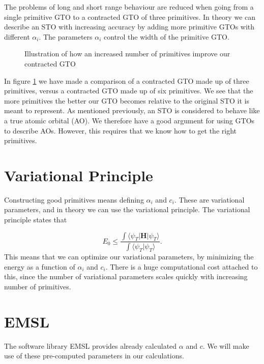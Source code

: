 \documentclass[a4paper,norsk,11pt,twoside]{report}
\begin{document}
The problems of long and short range behaviour are reduced when going
from a single primitive GTO to a contracted GTO of three
primitives. In theory we can describe an STO with increasing accuracy by
adding more primitive GTOs with different $\alpha_i$. The parameters $\alpha_i$
control the width of the primitive GTO.  \\

\begin{figure}[h!]
\begin{center}
\caption{Illustration of how an increased number of primitives improve our contracted GTO}
\label{fig:STOvsGTO3}
\end{center}
\end{figure}

In figure \ref{fig:STOvsGTO3} we have made a comparison of a
contracted GTO made up of three primitives, versus a contracted GTO
made up of six primitives. We see that the more primitives the better our
GTO becomes relative to the original STO it is meant to represent. As mentioned previously, an STO is
considered to behave like a true atomic orbital (AO). We therefore have a
good argument for using GTOs to describe AOs. However, this requires
that we know how to get the right primitives.

\section{Variational Principle}
Constructing good primitives means defining $\alpha_i$ and
$c_i$. These are variational parameters, and in theory we can use the
variational principle. The variational principle states that

\begin{equation}
E_0 \le \frac{\int \langle \psi_T | \textbf{H} | \psi_T \rangle}{\int \langle \psi_T | \psi_T \rangle} .
\end{equation}
This means that we can optimize our variational parameters, by
minimizing the energy as a function of $\alpha_i$ and $c_i$. There is
a huge computational cost attached to this, since the number of
variational parameters scales quickly with increasing number of
primitives. 

\section{EMSL}
The software library EMSL \cite{emsl_stuffies,emsl_stuffies2,emsl_stuffies3} provides already calculated $\alpha$ and $c$. 
We will make use of these pre-computed
parameters in our calculations.
\end{document}
